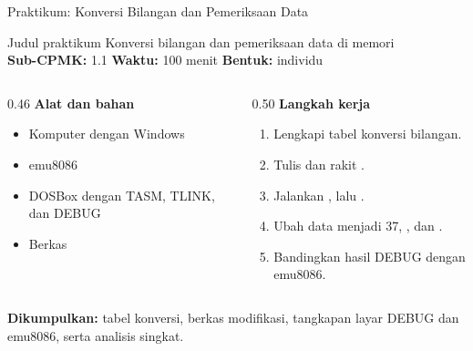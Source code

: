 \documentclass[aspectratio=169,11pt]{beamer}
\begin{document}
\begin{frame}{Praktikum: Konversi Bilangan dan Pemeriksaan Data}
\begin{block}{Judul praktikum}
\small Konversi bilangan dan pemeriksaan data di memori\\[0.15em]
\textbf{Sub-CPMK:} 1.1 \quad\textbullet\quad
\textbf{Waktu:} 100 menit \quad\textbullet\quad
\textbf{Bentuk:} individu
\end{block}

\vspace{0.2em}
\begin{columns}[t]
\begin{column}{0.46\textwidth}
{\color{obeBlue}\bfseries Alat dan bahan}
\begin{itemize}\footnotesize
    \item Komputer dengan Windows
    \item emu8086
    \item DOSBox dengan TASM, TLINK, dan DEBUG
    \item Berkas 
\end{itemize}
\end{column}
\begin{column}{0.50\textwidth}
{\color{obeBlue}\bfseries Langkah kerja}
\begin{enumerate}\footnotesize
    \item Lengkapi tabel konversi bilangan.
    \item Tulis dan rakit .
    \item Jalankan , lalu .
    \item Ubah data menjadi 37, , dan .
    \item Bandingkan hasil DEBUG dengan emu8086.
\end{enumerate}
\end{column}
\end{columns}

\vspace{0.2em}
{\footnotesize\textbf{Dikumpulkan:} tabel konversi, berkas
 modifikasi, tangkapan layar DEBUG dan emu8086, serta
analisis singkat.\par}
\end{frame}
\end{document}
